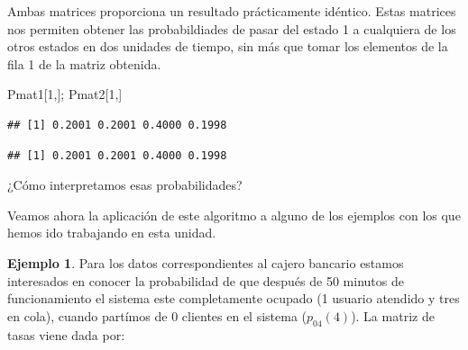 \documentclass[
]{book}
\newenvironment{Shaded}{\begin{snugshade}}{\end{snugshade}}
\newcommand{\DecValTok}[1]{\textcolor[rgb]{0.00,0.00,0.81}{#1}}
\newcommand{\NormalTok}[1]{#1}
\theoremstyle{definition}
\theoremstyle{definition}
\newtheorem{example}{Ejemplo}[chapter]
\theoremstyle{definition}
\theoremstyle{definition}
\theoremstyle{remark}
\begin{document}
Ambas matrices proporciona un resultado prácticamente idéntico. Estas matrices nos permiten obtener las probabildiades de pasar del estado 1 a cualquiera de los otros estados en dos unidades de tiempo, sin más que tomar los elementos de la fila 1 de la matriz obtenida.

\begin{Shaded}
\begin{Highlighting}[]
\NormalTok{Pmat1[}\DecValTok{1}\NormalTok{,]; Pmat2[}\DecValTok{1}\NormalTok{,]}
\end{Highlighting}
\end{Shaded}

\begin{verbatim}
## [1] 0.2001 0.2001 0.4000 0.1998
\end{verbatim}

\begin{verbatim}
## [1] 0.2001 0.2001 0.4000 0.1998
\end{verbatim}

¿Cómo interpretamos esas probabilidades?

Veamos ahora la aplicación de este algoritmo a alguno de los ejemplos con los que hemos ido trabajando en esta unidad.

\begin{example}
Para los datos correspondientes al cajero bancario estamos interesados en conocer la probabilidad de que después de 50 minutos de funcionamiento el sistema este completamente ocupado (1 usuario atendido y tres en cola), cuando partímos de \(0\) clientes en el sistema (\(p_{04}(4)\)). La matriz de tasas viene dada por:
\end{example}
\end{document}
